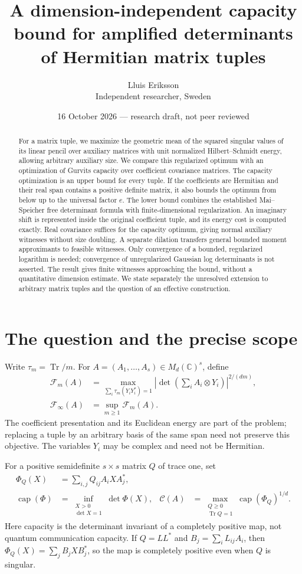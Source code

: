 \documentclass[11pt]{article}
\title{A dimension-independent capacity bound for amplified determinants\\of Hermitian matrix tuples}
\author{Lluis Eriksson\\Independent researcher, Sweden}
\date{16 October 2026 --- research draft, not peer reviewed}
\newcommand{\C}{\mathbb C}
\newcommand{\Tr}{\operatorname{Tr}}
\newcommand{\capop}{\operatorname{cap}}
\newcommand{\F}{\mathcal F}
\newcommand{\K}{\mathcal C}
\begin{document}
\maketitle
\begin{abstract}
For a matrix tuple, we maximize the geometric mean of the squared singular values of its linear pencil over auxiliary matrices with unit normalized Hilbert--Schmidt energy, allowing arbitrary auxiliary size. We compare this regularized optimum with an optimization of Gurvits capacity over coefficient covariance matrices. The capacity optimization is an upper bound for every tuple. If the coefficients are Hermitian and their real span contains a positive definite matrix, it also bounds the optimum from below up to the universal factor $e$. The lower bound combines the established Mai--Speicher free determinant formula with finite-dimensional regularization. An imaginary shift is represented inside the original coefficient tuple, and its energy cost is computed exactly. Real covariance suffices for the capacity optimum, giving normal auxiliary witnesses without size doubling. A separate dilation transfers general bounded moment approximants to feasible witnesses. Only convergence of a bounded, regularized logarithm is needed; convergence of unregularized Gaussian log determinants is not asserted. The result gives finite witnesses approaching the bound, without a quantitative dimension estimate. We state separately the unresolved extension to arbitrary matrix tuples and the question of an effective construction.
\end{abstract}

\section{The question and the precise scope}
Write $\tau_m=\Tr/m$. For $A=(A_1,\ldots,A_s)\in M_d(\C)^s$, define
\begin{align}
 \F_m(A)&=\max_{\sum_i\tau_m(Y_iY_i^*)=1}
 \left|\det\left(\sum_i A_i\otimes Y_i\right)\right|^{2/(dm)},\label{eq:F}\\
 \F_\infty(A)&=\sup_{m\ge1}\F_m(A).
\end{align}
The coefficient presentation and its Euclidean energy are part of the problem; replacing a tuple by an arbitrary basis of the same span need not preserve this objective. The variables $Y_i$ may be complex and need not be Hermitian.

For a positive semidefinite $s\times s$ matrix $Q$ of trace one, set
\begin{align}
 \Phi_Q(X)&=\sum_{i,j}Q_{ij}A_iXA_j^*,\\
 \capop(\Phi)&=\inf_{\substack{X>0\\\det X=1}}\det\Phi(X),&
 \K(A)&=\max_{\substack{Q\ge0\\\Tr Q=1}}\capop(\Phi_Q)^{1/d}.\label{eq:C}
\end{align}
Here capacity is the determinant invariant of a completely positive map, not quantum communication capacity. If $Q=LL^*$ and $B_j=\sum_iL_{ij}A_i$, then $\Phi_Q(X)=\sum_jB_jXB_j^*$, so the map is completely positive even when $Q$ is singular.
\end{document}
